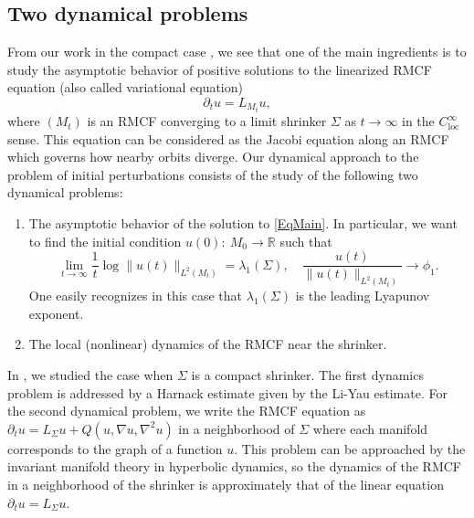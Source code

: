 \documentclass[12pt]{amsart}
\numberwithin{equation}{section}
\numberwithin{equation}{section}
\newcommand{\R}{\mathbb{R}}
\DeclareMathOperator{\loc}{loc}
\begin{document}
	\subsection{Two dynamical problems}
	From our work in the compact case \cite{SX}, we see that one of the main ingredients is to study the asymptotic behavior of positive solutions to  the linearized RMCF equation (also called variational equation)
	\begin{equation}\label{EqMain}
		\partial_t u=L_{M_t} u,
	\end{equation}
	where $(M_t)$ is an RMCF converging to a limit shrinker $\Sigma$ as $t\to\infty$ in the $C^\infty_{\loc}$ sense. This equation can be considered as the Jacobi equation along an RMCF which governs how nearby orbits diverge. 
	Our dynamical approach to the problem of initial perturbations consists of the study of the following two dynamical problems:
	\begin{enumerate}
		\item The asymptotic behavior of the solution to \eqref{EqMain}. In particular, we want to find the initial condition $u(0):\ M_0\to \R$ such that $$\lim_{t\to\infty}\frac{1}{t}\log\|u(t)\|_{L^2(M_t)}=\lambda_1(\Sigma),\quad \frac{u(t)}{\|u(t)\|_{L^2(M_t)}}\to \phi_1.$$ One easily recognizes in this case that $\lambda_1(\Sigma)$ is the leading Lyapunov exponent. 
		\item The local (nonlinear) dynamics of the RMCF near the shrinker. 
	\end{enumerate}
	In \cite{SX}, we studied the case when $\Sigma$ is a compact shrinker. The first dynamics problem is addressed by a Harnack estimate given by the Li-Yau estimate. For the second dynamical problem, we write the RMCF equation as $\partial_t u=L_\Sigma u+Q(u,\nabla u,\nabla^2u)$ in a neighborhood of $\Sigma$ where each manifold corresponds to the graph of a function $u$.  This problem can be approached by the invariant manifold theory in hyperbolic dynamics, so the dynamics of the RMCF in a neighborhood of the shrinker is approximately that of the linear equation $\partial_t u=L_\Sigma u$. 
	
\end{document}
